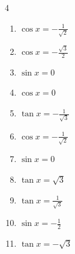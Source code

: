 \begin{multicols}{4}
\begin{enumerate}
  \item $\displaystyle \cos{x}  = -\frac{1}{\sqrt{2}}$


  \item $\displaystyle \cos{x}  = -\frac{\sqrt{3}}{2}$


  \item $\displaystyle \sin{x}  = 0$

        \phantom{$\displaystyle x = 0 , \pi$}

  \item $\displaystyle \cos{x}  = 0$


  \item $\displaystyle \tan{x}  = -\frac{1}{\sqrt{3}}$


  \item $\displaystyle \cos{x}  = -\frac{1}{\sqrt{2}}$


  \item $\displaystyle \sin{x}  = 0$

        \phantom{$\displaystyle x = 0 , \pi$}

  \item $\displaystyle \tan{x}  = \sqrt{3}$


  \item $\displaystyle \tan{x}  = \frac{1}{\sqrt{3}}$


  \item $\displaystyle \sin{x}  = -\frac{1}{2}$


\columnbreak %

  \item $\displaystyle \tan{x}  = -\sqrt{3}$



\end{enumerate}
\end{multicols}
